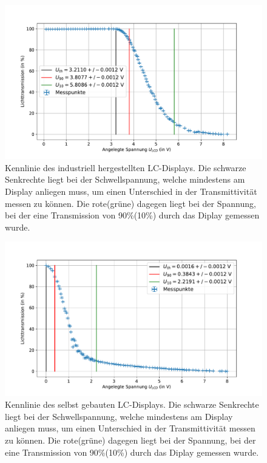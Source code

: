 \documentclass[
	a4paper,
	12pt,
	pagesize,
	ngerman
]{scrartcl}
\begin{document}
	\begin{figure}[H]
			\includegraphics[width=1\linewidth]{images/industry.pdf}
			\caption{Kennlinie des industriell hergestellten LC-Displays.
			Die schwarze Senkrechte liegt bei der Schwellspannung, welche mindestens am Display anliegen muss, um einen Unterschied in der Transmittivität messen zu können. %
			Die rote(grüne) dagegen liegt bei der Spannung, bei der eine Transmission von 90\%(10\%) durch das Diplay gemessen wurde.
			}
			\label{fig_industry}
	\end{figure}
	\begin{figure}[H]
			\includegraphics[width=1\linewidth]{images/selfmade.pdf}
			\caption{Kennlinie des selbst gebauten LC-Displays.
			Die schwarze Senkrechte liegt bei der Schwellspannung, welche mindestens am Display anliegen muss, um einen Unterschied in der Transmittivität messen zu können.
			Die rote(grüne) dagegen liegt bei der Spannung, bei der eine Transmission von 90\%(10\%) durch das Diplay gemessen wurde.
			}
			\label{fig_selfmade}
	\end{figure}
\end{document}
